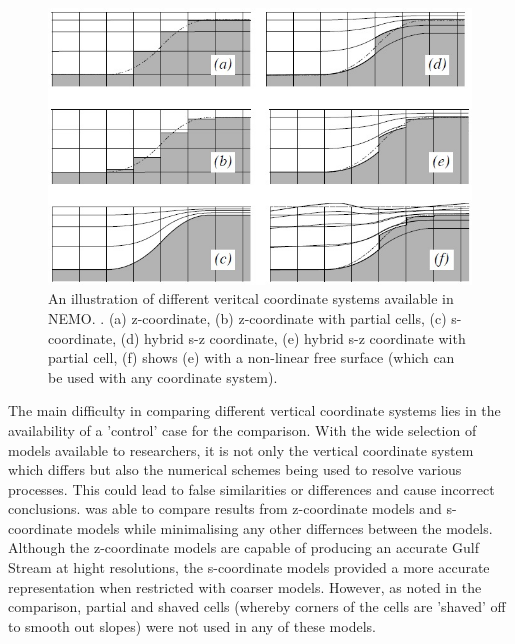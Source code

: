 \documentclass[..\EOYR.tex]{subfiles}
\begin{document}
\begin{figure}[t]
  \includegraphics[width=\linewidth]{NEMOP58.jpg}
  \caption{An illustration of different veritcal coordinate systems available in NEMO. \citep{Madec2011}. (a) z-coordinate, (b) z-coordinate with partial cells, (c) s-coordinate, (d) hybrid s-z coordinate, (e) hybrid s-z coordinate with partial cell, (f) shows (e) with a non-linear free surface (which can be used with any coordinate system).}
  \label{FIG:coords}
\end{figure}

The main difficulty in comparing different vertical coordinate systems lies in the availability of a 'control' case for the comparison. With the wide selection of models available to researchers, it is not only the vertical coordinate system which differs but also the numerical schemes being used to resolve various processes. This could lead to false similarities or differences and cause incorrect conclusions. \citep{Ezer2016b} was able to compare results from z-coordinate models and s-coordinate models while minimalising any other differnces between the models. Although the z-coordinate models are capable of producing an accurate Gulf Stream at hight resolutions, the s-coordinate models provided a more accurate representation when restricted with coarser models. However, as \citep{Ezer2016b} noted in the comparison, partial and shaved cells (whereby corners of the cells are 'shaved' off to smooth out slopes) were not used in any of these models.
\end{document}
